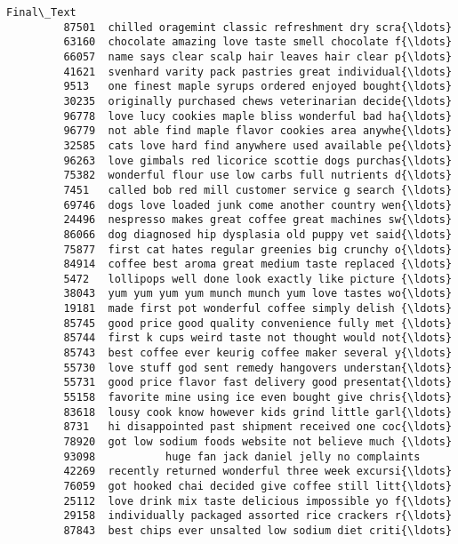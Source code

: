 \documentclass[11pt]{article}
\begin{document}
\begin{Verbatim}[commandchars=\\\{\}]
                                                       Final\_Text  
         87501  chilled oragemint classic refreshment dry scra{\ldots}  
         63160  chocolate amazing love taste smell chocolate f{\ldots}  
         66057  name says clear scalp hair leaves hair clear p{\ldots}  
         41621  svenhard varity pack pastries great individual{\ldots}  
         9513   one finest maple syrups ordered enjoyed bought{\ldots}  
         30235  originally purchased chews veterinarian decide{\ldots}  
         96778  love lucy cookies maple bliss wonderful bad ha{\ldots}  
         96779  not able find maple flavor cookies area anywhe{\ldots}  
         32585  cats love hard find anywhere used available pe{\ldots}  
         96263  love gimbals red licorice scottie dogs purchas{\ldots}  
         75382  wonderful flour use low carbs full nutrients d{\ldots}  
         7451   called bob red mill customer service g search {\ldots}  
         69746  dogs love loaded junk come another country wen{\ldots}  
         24496  nespresso makes great coffee great machines sw{\ldots}  
         86066  dog diagnosed hip dysplasia old puppy vet said{\ldots}  
         75877  first cat hates regular greenies big crunchy o{\ldots}  
         84914  coffee best aroma great medium taste replaced {\ldots}  
         5472   lollipops well done look exactly like picture {\ldots}  
         38043  yum yum yum yum munch munch yum love tastes wo{\ldots}  
         19181  made first pot wonderful coffee simply delish {\ldots}  
         85745  good price good quality convenience fully met {\ldots}  
         85744  first k cups weird taste not thought would not{\ldots}  
         85743  best coffee ever keurig coffee maker several y{\ldots}  
         55730  love stuff god sent remedy hangovers understan{\ldots}  
         55731  good price flavor fast delivery good presentat{\ldots}  
         55158  favorite mine using ice even bought give chris{\ldots}  
         83618  lousy cook know however kids grind little garl{\ldots}  
         8731   hi disappointed past shipment received one coc{\ldots}  
         78920  got low sodium foods website not believe much {\ldots}  
         93098           huge fan jack daniel jelly no complaints  
         42269  recently returned wonderful three week excursi{\ldots}  
         76059  got hooked chai decided give coffee still litt{\ldots}  
         25112  love drink mix taste delicious impossible yo f{\ldots}  
         29158  individually packaged assorted rice crackers r{\ldots}  
         87843  best chips ever unsalted low sodium diet criti{\ldots}  

\end{Verbatim}
\end{document}
